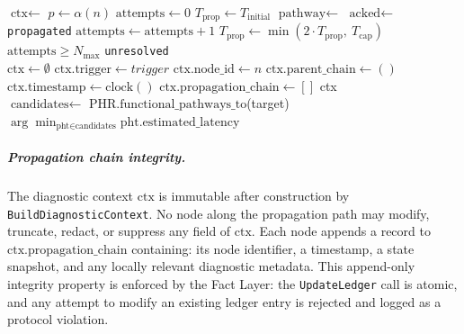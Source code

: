 \begin{algorithm}[htbp]
\caption{Bailout Protocol escalation algorithm.}
\label{alg:escalate}
\begin{algorithmic}[1]
  \State $\text{ctx} \leftarrow$ 
  \State $p \leftarrow \alpha(n)$
  \State $\text{attempts} \leftarrow 0$
  \State $T_{\text{prop}} \leftarrow T_{\text{initial}}$
  \Repeat
    \State $\text{pathway} \leftarrow$ 
    \State $\text{acked} \leftarrow$ 
    \State {}
      \State {}
      \State \Return \texttt{propagated}
    \EndIf
    \State $\text{attempts} \leftarrow \text{attempts} + 1$
    \State $T_{\text{prop}} \leftarrow \min(2 \cdot T_{\text{prop}},\ T_{\text{cap}})$
    \State {}
  \Until $\text{attempts} \geq N_{\max}$
  \State {}
  \State {}
  \State \Return \texttt{unresolved}
\EndProcedure
\\[6pt]
  \State $\text{ctx} \leftarrow \emptyset$
  \State $\text{ctx.trigger} \leftarrow trigger$
  \State $\text{ctx.node\_id} \leftarrow n$
  \State $\text{ctx.parent\_chain} \leftarrow ()$
  \State $\text{ctx.timestamp} \leftarrow \text{clock}()$
  \State $\text{ctx.propagation\_chain} \leftarrow []$
  \State \Return ctx
\EndProcedure
\\[6pt]
  \State $\text{candidates} \leftarrow$ PHR.$\text{functional\_pathways\_to}$(target)
  \State \Return $\displaystyle\arg\min_{\text{pht}\in\text{candidates}} \text{pht.estimated\_latency}$
\EndProcedure
\end{algorithmic}
\end{algorithm}

\subparagraph{Propagation chain integrity.} The diagnostic context $\text{ctx}$ is immutable after construction by \texttt{BuildDiagnosticContext}. No node along the propagation path may modify, truncate, redact, or suppress any field of $\text{ctx}$. Each node appends a record to $\text{ctx.propagation\_chain}$ containing: its node identifier, a timestamp, a state snapshot, and any locally relevant diagnostic metadata. This append-only integrity property is enforced by the Fact Layer: the \texttt{UpdateLedger} call is atomic, and any attempt to modify an existing ledger entry is rejected and logged as a protocol violation.

